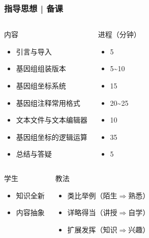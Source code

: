 \documentclass[table]{beamer}
\begin{document}
\begin{frame}
  \frametitle{指导思想 | 备课}
  \begin{columns}
  \begin{block}{内容}
    \begin{itemize}
      \item 引言与导入
      \item 基因组组装版本
      \item 基因组坐标系统
      \item 基因组注释常用格式
      \item 文本文件与文本编辑器
      \item 基因组坐标的逻辑运算
      \item 总结与答疑
    \end{itemize}
  \end{block}
  \begin{block}{进程（分钟）}
    \begin{itemize}
      \item 5
      \item 5\textasciitilde 10
      \item 15
      \item 20\textasciitilde 25
      \item 10
      \item 35
      \item 5
    \end{itemize}
  \end{block}
\end{columns}
  \pause
  \begin{columns}
  \begin{block}{学生}
    \begin{itemize}
      \item 知识全新
      \item 内容抽象
    \end{itemize}
  \end{block}
  \begin{block}{教法}
    \begin{itemize}
      \item 类比举例（陌生$\Rightarrow$熟悉）
      \item 详略得当（讲授$\Rightarrow$自学）
      \item 扩展发挥（知识$\Rightarrow$兴趣）
    \end{itemize}
  \end{block}
\end{columns}
\end{frame}
\end{document}
